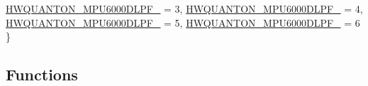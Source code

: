 \begin{DoxyCompactItemize}
\hyperlink{group___hw_quanton_gga35671a0feedc26dee50a9dd8a278fb8da0b705fa9c31e0908e1b1009b6d8048ca}{\-H\-W\-Q\-U\-A\-N\-T\-O\-N\-\_\-\-M\-P\-U6000\-D\-L\-P\-F\-\_} = 3, 
\*
\hyperlink{group___hw_quanton_gga35671a0feedc26dee50a9dd8a278fb8da8c1848744e119052f95cb33aa31dffed}{\-H\-W\-Q\-U\-A\-N\-T\-O\-N\-\_\-\-M\-P\-U6000\-D\-L\-P\-F\-\_} = 4, 
\hyperlink{group___hw_quanton_gga35671a0feedc26dee50a9dd8a278fb8da257fed3c65a0ef05b8be37897a4a9572}{\-H\-W\-Q\-U\-A\-N\-T\-O\-N\-\_\-\-M\-P\-U6000\-D\-L\-P\-F\-\_} = 5, 
\hyperlink{group___hw_quanton_gga35671a0feedc26dee50a9dd8a278fb8daef211dd446d8d48fa8b59ec60bb915f2}{\-H\-W\-Q\-U\-A\-N\-T\-O\-N\-\_\-\-M\-P\-U6000\-D\-L\-P\-F\-\_} = 6
 \}
\end{DoxyCompactItemize}
\subsection*{\-Functions}
